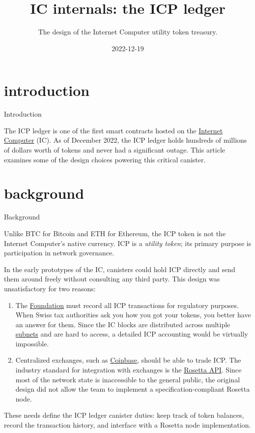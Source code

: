 \documentclass{article}
\title{IC internals: the ICP ledger}
\subtitle{The design of the Internet Computer utility token treasury.}
\date{2022-12-19}
\begin{document}
\section{introduction}{Introduction}

The ICP ledger is one of the first smart contracts hosted on the \href{https://internetcomputer.org}{Internet Computer} (IC).
As of December 2022, the ICP ledger holds hundreds of millions of dollars worth of tokens and never had a significant outage.
This article examines some of the design choices powering this critical canister.

\section{background}{Background}

Unlike BTC for Bitcoin and ETH for Ethereum, the ICP token is not the Internet Computer's native currency.
ICP is a \emph{utility token}; its primary purpose is participation in network governance.

In the early prototypes of the IC, canisters could hold ICP directly and send them around freely without consulting any third party.
This design was unsatisfactory for two reasons:
\begin{enumerate}
  \item
    The \href{https://dfinity.org/}{Foundation} must record all ICP transactions for regulatory purposes.
    When Swiss tax authorities ask you how you got your tokens, you better have an answer for them.
    Since the IC blocks are distributed across multiple \href{/posts/08-ic-xnet.html#subnets}{subnets} and are hard to access, a detailed ICP accounting would be virtually impossible.
  \item
    Centralized exchanges, such as \href{https://www.coinbase.com/}{Coinbase}, should be able to trade ICP.
    The industry standard for integration with exchanges is the \href{https://rosetta-api.org/}{Rosetta API}.
    Since most of the network state is inaccessible to the general public, the original design did not allow the team to implement a specification-compliant Rosetta node.
\end{enumerate}

These needs define the ICP ledger canister duties: keep track of token balances, record the transaction history, and interface with a Rosetta node implementation.
\end{document}
